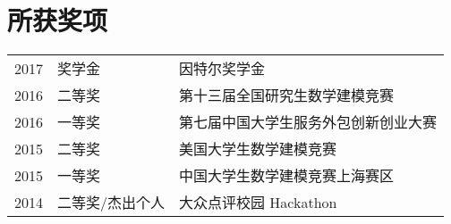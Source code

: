 \documentclass[]{deedy-resume-openfont}
\begin{document}
\begin{minipage}[t]{0.73\textwidth}

\section{所获奖项} 
\begin{tabular}{rll}
2017         & 奖学金  & 因特尔奖学金 \\
2016	     & 二等奖  & 第十三届全国研究生数学建模竞赛 \\
2016	     & 一等奖  & 第七届中国大学生服务外包创新创业大赛 \\
2015	     & 二等奖  & 美国大学生数学建模竞赛 \\
2015         & 一等奖 & 中国大学生数学建模竞赛上海赛区 \\
2014	     & 二等奖/杰出个人  & 大众点评校园 Hackathon \\
\end{tabular}
\sectionsep


% 
% 

\end{minipage} 
\end{document}
